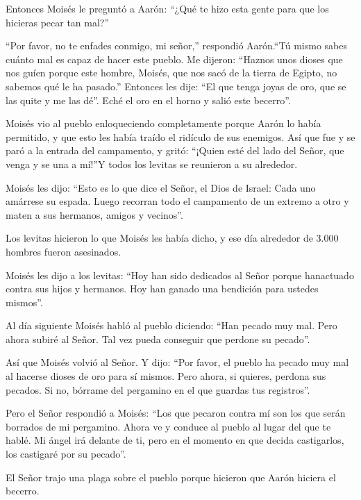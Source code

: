  Entonces Moisés le preguntó a Aarón: ``¿Qué te hizo esta
gente para que los hicieras pecar tan mal?''

 ``Por favor, no te enfades conmigo, mi señor,'' respondió
Aarón.``Tú mismo sabes cuánto mal es capaz de hacer este pueblo.
 Me dijeron: ``Haznos unos dioses que nos guíen porque este
hombre, Moisés, que nos sacó de la tierra de Egipto, no sabemos qué le
ha pasado.''  Entonces les dije: ``El que tenga joyas de
oro, que se las quite y me las dé''. Eché el oro en el horno y salió
este becerro''.

 Moisés vio al pueblo enloqueciendo completamente porque
Aarón lo había permitido, y que esto les había traído el ridículo de sus
enemigos.  Así que fue y se paró a la entrada del
campamento, y gritó: ``¡Quien esté del lado del Señor, que venga y se
una a mí!''Y todos los levitas se reunieron a su alrededor.

 Moisés les dijo: ``Esto es lo que dice el Señor, el Dios
de Israel: Cada uno amárrese su espada. Luego recorran todo el
campamento de un extremo a otro y maten a sus hermanos, amigos y
vecinos''.

 Los levitas hicieron lo que Moisés les había dicho, y ese
día alrededor de 3.000 hombres fueron asesinados.

 Moisés les dijo a los levitas: ``Hoy han sido dedicados al
Señor porque hanactuado contra sus hijos y hermanos. Hoy han ganado una
bendición para ustedes mismos''.

 Al día siguiente Moisés habló al pueblo diciendo: ``Han
pecado muy mal. Pero ahora subiré al Señor. Tal vez pueda conseguir que
perdone su pecado''.

 Así que Moisés volvió al Señor. Y dijo: ``Por favor, el
pueblo ha pecado muy mal al hacerse dioses de oro para sí mismos.
 Pero ahora, si quieres, perdona sus pecados. Si no,
bórrame del pergamino en el que guardas tus registros''.

 Pero el Señor respondió a Moisés: ``Los que pecaron contra
mí son los que serán borrados de mi pergamino.  Ahora ve y
conduce al pueblo al lugar del que te hablé. Mi ángel irá delante de ti,
pero en el momento en que decida castigarlos, los castigaré por su
pecado''.

 El Señor trajo una plaga sobre el pueblo porque hicieron
que Aarón hiciera el becerro.

